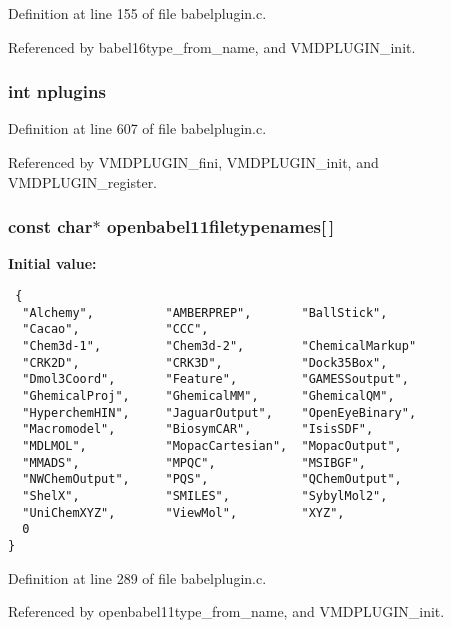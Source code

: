 Definition at line 155 of file babelplugin.c.

Referenced by babel16type\_\-from\_\-name, and VMDPLUGIN\_\-init.
\subsubsection{\setlength{\rightskip}{0pt plus 5cm}int nplugins\hspace{0.3cm}{\tt  [static]}}\label{babelplugin_8c_a6}




Definition at line 607 of file babelplugin.c.

Referenced by VMDPLUGIN\_\-fini, VMDPLUGIN\_\-init, and VMDPLUGIN\_\-register.
\subsubsection{\setlength{\rightskip}{0pt plus 5cm}const char$\ast$ openbabel11filetypenames[$\,$]\hspace{0.3cm}{\tt  [static]}}\label{babelplugin_8c_a4}


{\bf Initial value:}

\footnotesize\begin{verbatim} {
  "Alchemy",          "AMBERPREP",       "BallStick",      
  "Cacao",            "CCC",           
  "Chem3d-1",         "Chem3d-2",        "ChemicalMarkup"
  "CRK2D",            "CRK3D",           "Dock35Box",
  "Dmol3Coord",       "Feature",         "GAMESSoutput",     
  "GhemicalProj",     "GhemicalMM",      "GhemicalQM",
  "HyperchemHIN",     "JaguarOutput",    "OpenEyeBinary",
  "Macromodel",       "BiosymCAR",       "IsisSDF",
  "MDLMOL",           "MopacCartesian",  "MopacOutput",     
  "MMADS",            "MPQC",            "MSIBGF",  
  "NWChemOutput",     "PQS",             "QChemOutput",
  "ShelX",            "SMILES",          "SybylMol2",   
  "UniChemXYZ",       "ViewMol",         "XYZ",
  0
}\end{verbatim}\normalsize 


Definition at line 289 of file babelplugin.c.

Referenced by openbabel11type\_\-from\_\-name, and VMDPLUGIN\_\-init.
